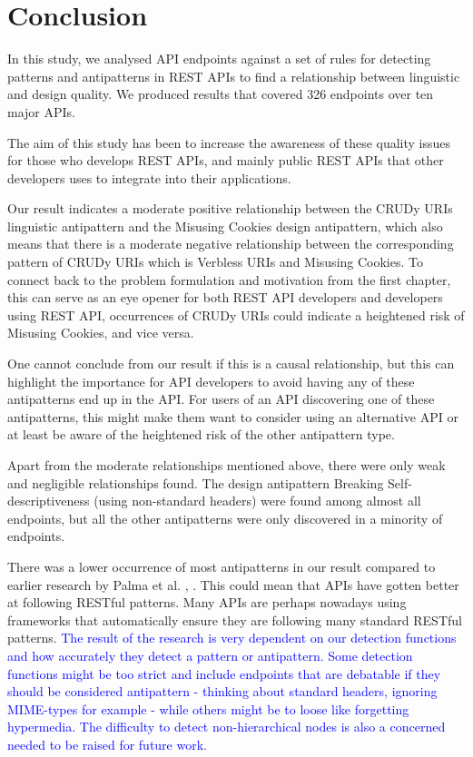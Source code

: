 \section{Conclusion}

In this study, we analysed API endpoints against a set of rules for detecting patterns and antipatterns in REST APIs to find a relationship between linguistic and design quality. We produced results that covered 326 endpoints over ten major APIs. 

The aim of this study has been to increase the awareness of these quality issues for those who develops REST APIs, and mainly public REST APIs that other developers uses to integrate into their applications. 

Our result indicates a moderate positive relationship between the  CRUDy URIs linguistic antipattern and the  Misusing Cookies design antipattern, which also means that there is a moderate negative relationship between the corresponding pattern of CRUDy URIs which is Verbless URIs and Misusing Cookies. To connect back to the problem formulation and motivation from the first chapter, this can serve as an eye opener for both REST API developers and developers using REST API, occurrences of CRUDy URIs could indicate a heightened risk of Misusing Cookies, and vice versa. 

One cannot conclude from our result if this is a causal relationship, but this can highlight the importance for API developers to avoid having any of these antipatterns end up in the API. For users of an API discovering one of these antipatterns, this might make them want to consider using an alternative API or at least be aware of the heightened risk of the other antipattern type. 

Apart from the moderate relationships mentioned above, there were only weak and negligible relationships found. The design antipattern Breaking Self-descriptiveness (using non-standard headers) were found among almost all endpoints, but all the other antipatterns were only discovered in a minority of endpoints. 

There was a lower occurrence of most antipatterns in our result compared to earlier research by Palma et al. \cite{design}, \cite{linguistic}. This could mean that APIs have gotten better at following RESTful patterns. Many APIs are perhaps nowadays using frameworks that automatically ensure they are following many standard RESTful patterns. \textcolor{blue}{The result of the research is very dependent on our detection functions and how accurately they detect a pattern or antipattern. Some detection functions might be too strict and include endpoints that are debatable if they should be considered antipattern - thinking about standard headers, ignoring MIME-types for example - while others might be to loose like forgetting hypermedia. The difficulty to detect non-hierarchical nodes is also a concerned needed to be raised for future work.}

